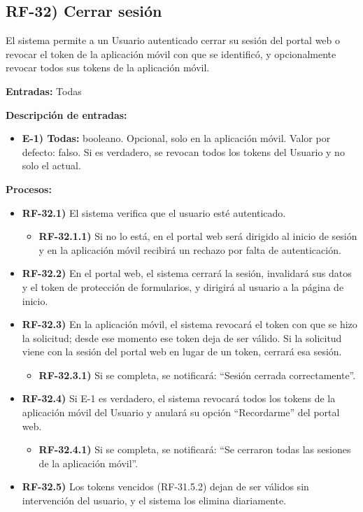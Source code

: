 \subsection*{RF-32) Cerrar sesi\'on}
El sistema permite a un Usuario autenticado cerrar su sesi\'on del portal web o revocar el token de la aplicaci\'on m\'ovil con que se identific\'o, y opcionalmente revocar todos sus tokens de la aplicaci\'on m\'ovil.

\textbf{Entradas:} Todas

\textbf{Descripci\'on de entradas:}
\begin{itemize}[label={}, leftmargin=1.5em]
  \item \textbf{E-1) Todas:} booleano. Opcional, solo en la aplicaci\'on m\'ovil. Valor por defecto: falso. Si es verdadero, se revocan todos los tokens del Usuario y no solo el actual.
\end{itemize}

\textbf{Procesos:}
\begin{itemize}[label={}, leftmargin=1.5em]
  \item \textbf{RF-32.1)} El sistema verifica que el usuario est\'e autenticado.
  \begin{itemize}[label={}, leftmargin=1.5em]
    \item \textbf{RF-32.1.1)} Si no lo est\'a, en el portal web ser\'a dirigido al inicio de sesi\'on y en la aplicaci\'on m\'ovil recibir\'a un rechazo por falta de autenticaci\'on.
  \end{itemize}
  \item \textbf{RF-32.2)} En el portal web, el sistema cerrar\'a la sesi\'on, invalidar\'a sus datos y el token de protecci\'on de formularios, y dirigir\'a al usuario a la p\'agina de inicio.
  \item \textbf{RF-32.3)} En la aplicaci\'on m\'ovil, el sistema revocar\'a el token con que se hizo la solicitud; desde ese momento ese token deja de ser v\'alido. Si la solicitud viene con la sesi\'on del portal web en lugar de un token, cerrar\'a esa sesi\'on.
  \begin{itemize}[label={}, leftmargin=1.5em]
    \item \textbf{RF-32.3.1)} Si se completa, se notificar\'a: ``Sesi\'on cerrada correctamente''.
  \end{itemize}
  \item \textbf{RF-32.4)} Si E-1 es verdadero, el sistema revocar\'a todos los tokens de la aplicaci\'on m\'ovil del Usuario y anular\'a su opci\'on ``Recordarme'' del portal web.
  \begin{itemize}[label={}, leftmargin=1.5em]
    \item \textbf{RF-32.4.1)} Si se completa, se notificar\'a: ``Se cerraron todas las sesiones de la aplicaci\'on m\'ovil''.
  \end{itemize}
  \item \textbf{RF-32.5)} Los tokens vencidos (RF-31.5.2) dejan de ser v\'alidos sin intervenci\'on del usuario, y el sistema los elimina diariamente.
\end{itemize}

